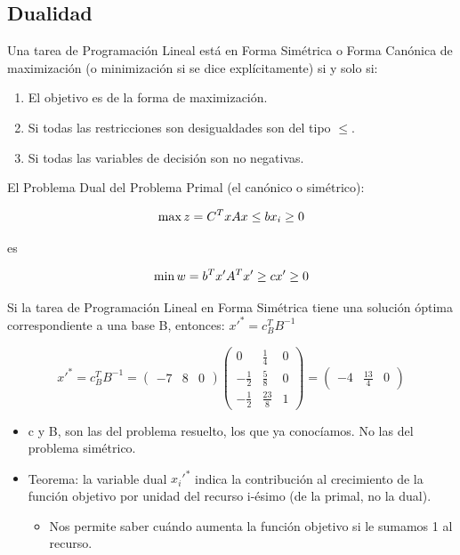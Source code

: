 \documentclass[12pt, twoside, openright]{report} %
\begin{document}
\subsection{Dualidad}

Una tarea de Programación Lineal está en Forma Simétrica o Forma
Canónica de maximización (o minimización si se dice explícitamente) si
y solo si: 

\begin{enumerate}
	\item El objetivo es de la forma de maximización.
	\item Si todas las restricciones son desigualdades son del tipo $\leq$.
	\item Si todas las variables de decisión son no negativas.
\end{enumerate}

El Problema Dual del Problema Primal (el canónico o simétrico):

\begin{minipage}{.5\linewidth}
	$$\max z = C^{T}x \\  
	Ax\leq b \\ 
	x_{i} \geq 0$$
\end{minipage}
es
\begin{minipage}{.5\linewidth}
	$$\min w = b^{T}x' \\ 
	A^Tx' \geq c \\ 
	x' \geq 0$$
\end{minipage}

Si la tarea de Programación Lineal en Forma Simétrica tiene una
solución óptima correspondiente a una base B, entonces:
\(x'^*= c_B^TB^{-1}\)

$$x'^*=c^T_BB^{-1}=\left( \begin{matrix} -7 & 8 & 0 \end{matrix} \right) \left( \begin{matrix} 0 & \frac 1 4 & 0 \\ - \frac 1 2 & \frac 5 8 & 0 \\ - \frac 1 2 & \frac {23} 8 & 1 \end{matrix} \right) = \left( \begin{matrix} -4 & \frac {13} 4 & 0 \end{matrix} \right)$$

\begin{itemize}

	\item c y B, son las del problema resuelto, los que ya conocíamos. No las
	del problema simétrico.
	\item Teorema: la variable dual \(x_i'^*\) indica la contribución al
	crecimiento de la función objetivo por unidad del recurso i-ésimo
	(de la primal, no la dual).
	\begin{itemize}
		\item  Nos permite saber cuándo aumenta la función objetivo si le sumamos
	1 al recurso.
	\end{itemize}

\end{itemize}
\end{document}
